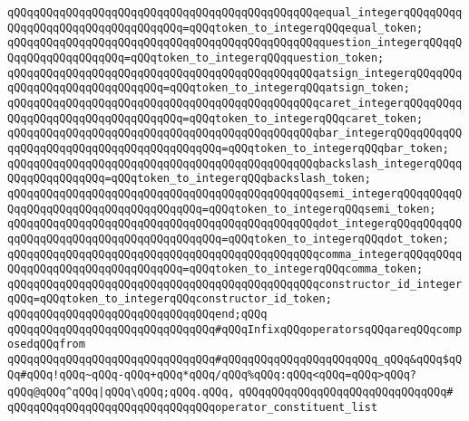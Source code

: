 \verb|qQQqqQQqqQQqqQQqqQQqqQQqqQQqqQQqqQQqqQQqqQQqqQQqequal_integerqQQqqQQqqQQqqQQqqQQqqQQqqQQqqQQqqQQq=qQQqtoken_to_integerqQQqequal_token;|\newline
\verb|qQQqqQQqqQQqqQQqqQQqqQQqqQQqqQQqqQQqqQQqqQQqqQQqquestion_integerqQQqqQQqqQQqqQQqqQQqqQQq=qQQqtoken_to_integerqQQqquestion_token;|\newline
\verb|qQQqqQQqqQQqqQQqqQQqqQQqqQQqqQQqqQQqqQQqqQQqqQQqatsign_integerqQQqqQQqqQQqqQQqqQQqqQQqqQQqqQQq=qQQqtoken_to_integerqQQqatsign_token;|\newline
\verb|qQQqqQQqqQQqqQQqqQQqqQQqqQQqqQQqqQQqqQQqqQQqqQQqcaret_integerqQQqqQQqqQQqqQQqqQQqqQQqqQQqqQQqqQQq=qQQqtoken_to_integerqQQqcaret_token;|\newline
\verb|qQQqqQQqqQQqqQQqqQQqqQQqqQQqqQQqqQQqqQQqqQQqqQQqbar_integerqQQqqQQqqQQqqQQqqQQqqQQqqQQqqQQqqQQqqQQqqQQq=qQQqtoken_to_integerqQQqbar_token;|\newline
\verb|qQQqqQQqqQQqqQQqqQQqqQQqqQQqqQQqqQQqqQQqqQQqqQQqbackslash_integerqQQqqQQqqQQqqQQqqQQq=qQQqtoken_to_integerqQQqbackslash_token;|\newline
\verb|qQQqqQQqqQQqqQQqqQQqqQQqqQQqqQQqqQQqqQQqqQQqqQQqsemi_integerqQQqqQQqqQQqqQQqqQQqqQQqqQQqqQQqqQQqqQQq=qQQqtoken_to_integerqQQqsemi_token;|\newline
\verb|qQQqqQQqqQQqqQQqqQQqqQQqqQQqqQQqqQQqqQQqqQQqqQQqdot_integerqQQqqQQqqQQqqQQqqQQqqQQqqQQqqQQqqQQqqQQqqQQq=qQQqtoken_to_integerqQQqdot_token;|\newline
\verb|qQQqqQQqqQQqqQQqqQQqqQQqqQQqqQQqqQQqqQQqqQQqqQQqcomma_integerqQQqqQQqqQQqqQQqqQQqqQQqqQQqqQQqqQQq=qQQqtoken_to_integerqQQqcomma_token;|\newline
\newline
\verb|qQQqqQQqqQQqqQQqqQQqqQQqqQQqqQQqqQQqqQQqqQQqqQQqconstructor_id_integerqQQq=qQQqtoken_to_integerqQQqconstructor_id_token;|\newline
\verb|qQQqqQQqqQQqqQQqqQQqqQQqqQQqqQQqend;qQQq|\newline
\newline
\verb|qQQqqQQqqQQqqQQqqQQqqQQqqQQqqQQq#qQQqInfixqQQqoperatorsqQQqareqQQqcomposedqQQqfrom|\newline
\verb|qQQqqQQqqQQqqQQqqQQqqQQqqQQqqQQq#qQQqqQQqqQQqqQQqqQQqqQQq_qQQq&qQQq$qQQq#qQQq!qQQq~qQQq-qQQq+qQQq*qQQq/qQQq%qQQq:qQQq<qQQq=qQQq>qQQq?qQQq@qQQq^qQQq|\verb#|qQQq\qQQq;qQQq.qQQq,#\newline
\verb|qQQqqQQqqQQqqQQqqQQqqQQqqQQqqQQq#|\newline
\verb|qQQqqQQqqQQqqQQqqQQqqQQqqQQqqQQqoperator_constituent_list|\newline
